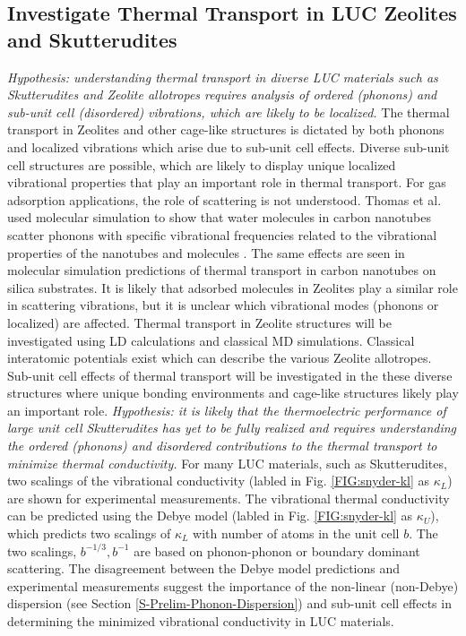 \documentclass[letterpaper,12pt]{article}
\begin{document}
\subsection{\label{S-Research-Objectives-2}Investigate Thermal Transport in LUC Zeolites and Skutterudites}
\textit{Hypothesis: understanding thermal transport in diverse LUC materials such as Skutterudites and Zeolite allotropes requires analysis of ordered (phonons) and sub-unit cell (disordered) vibrations, which are likely to be localized.}
The thermal transport in Zeolites and other cage-like structures is dictated by both phonons\cite{mcgaughey2004b} and localized vibrations which arise due to sub-unit cell effects.\cite{O'Keeffe20003,doi:10.1021/ar000034b} Diverse sub-unit cell structures are possible, which are likely to display unique localized vibrational properties that play an important role in thermal transport. For gas adsorption applications, the role of scattering is not understood. Thomas et al. used molecular simulation to show that water molecules in carbon nanotubes scatter phonons with specific vibrational frequencies related to the vibrational properties of the nanotubes and molecules \cite{thomas2010c}. The same effects are seen in molecular simulation predictions of thermal transport in carbon nanotubes on silica substrates.\cite{shiomi2011b} It is likely that adsorbed molecules in Zeolites play a similar role in scattering vibrations, but it is unclear which vibrational modes (phonons or localized) are affected.\cite{Miyamoto1994117}
Thermal transport in Zeolite structures will be investigated using LD calculations and classical MD simulations. Classical interatomic potentials exist which can describe the various Zeolite allotropes.\cite{mcgaughey2004b} Sub-unit cell effects of thermal transport will be investigated in the these diverse structures where unique bonding environments and cage-like structures likely play an important role.
\textit{Hypothesis: it is likely that the thermoelectric performance of large unit cell Skutterudites has yet to be fully realized and requires understanding the ordered (phonons) and disordered contributions to the thermal transport to minimize thermal conductivity.}
For many LUC materials, such as Skutterudites, two scalings of the vibrational conductivity
(labled in Fig. \ref{FIG:snyder-kl} as $\kappa_{L}$) are shown for experimental measurements.\cite{Toberer2011} The vibrational thermal conductivity can be predicted using the Debye model (labled in Fig. \ref{FIG:snyder-kl} as $\kappa_{U}$), which predicts two
scalings of $\kappa_{L}$ with number of atoms in the unit cell $b$. The two scalings, $b^{-1/3},b^{-1}$ are based on phonon-phonon or boundary dominant scattering.\cite{Toberer2011} The disagreement between the Debye model predictions and experimental measurements suggest the importance of the non-linear (non-Debye) dispersion (see Section \ref{S-Prelim-Phonon-Dispersion}) and sub-unit cell effects in determining the minimized vibrational conductivity in LUC materials.
\end{document}
